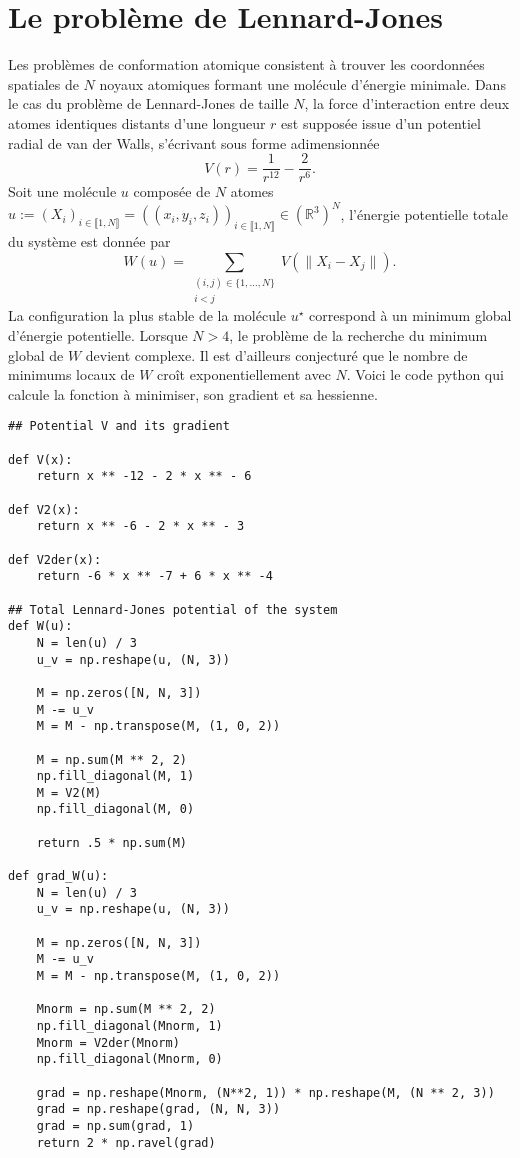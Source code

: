 \documentclass[a4paper,french,12pt]{article}
\begin{document}
\section{Le problème de Lennard-Jones} 
 Les problèmes de conformation atomique consistent à trouver les coordonnées spatiales de $N$ noyaux atomiques formant une molécule d'énergie minimale. Dans le cas du problème de 
Lennard-Jones de taille $N$, la force d'interaction entre
deux atomes identiques distants d'une longueur $r$ est supposée issue d'un potentiel radial de van der Walls, s'écrivant sous forme adimensionnée 
\[
V(r) = \frac{1}{r^{12}} - \frac{2}{r^6}.
\]
Soit une molécule $u$ composée de $N$ atomes $u := (X_i)_{i \in \llbracket 1,N \rrbracket} = \left((x_i,y_i,z_i)\right)_{i \in \llbracket 1,N \rrbracket} \in \left(\mathbb{R}^3 \right)^N$, l'énergie potentielle totale du système est donnée par
\[
W(u) = \sum_{\substack{(i,j) \in \{ 1, \ldots,N \} \\ i<j}} V\left(\|X_i-X_j\|\right).
\]
La configuration la plus stable de la molécule $u^\star$ correspond à un minimum global d'énergie
potentielle. %
Lorsque $N>4$, le problème de la recherche du minimum global de $W$ devient
complexe. Il est d'ailleurs conjecturé que le nombre de minimums locaux de $W$ croît exponentiellement avec $N$.
Voici le code python qui calcule la fonction à minimiser, son gradient et sa hessienne.
\begin{lstlisting}
## Potential V and its gradient  
  
def V(x):
    return x ** -12 - 2 * x ** - 6

def V2(x):
    return x ** -6 - 2 * x ** - 3

def V2der(x):
    return -6 * x ** -7 + 6 * x ** -4

## Total Lennard-Jones potential of the system    
def W(u):
    N = len(u) / 3
    u_v = np.reshape(u, (N, 3))

    M = np.zeros([N, N, 3])
    M -= u_v
    M = M - np.transpose(M, (1, 0, 2))

    M = np.sum(M ** 2, 2)
    np.fill_diagonal(M, 1)
    M = V2(M)
    np.fill_diagonal(M, 0)

    return .5 * np.sum(M)

def grad_W(u):
    N = len(u) / 3
    u_v = np.reshape(u, (N, 3))

    M = np.zeros([N, N, 3])
    M -= u_v
    M = M - np.transpose(M, (1, 0, 2))

    Mnorm = np.sum(M ** 2, 2)
    np.fill_diagonal(Mnorm, 1)
    Mnorm = V2der(Mnorm)
    np.fill_diagonal(Mnorm, 0)

    grad = np.reshape(Mnorm, (N**2, 1)) * np.reshape(M, (N ** 2, 3))
    grad = np.reshape(grad, (N, N, 3))
    grad = np.sum(grad, 1)
    return 2 * np.ravel(grad)
\end{lstlisting}
\end{document}
